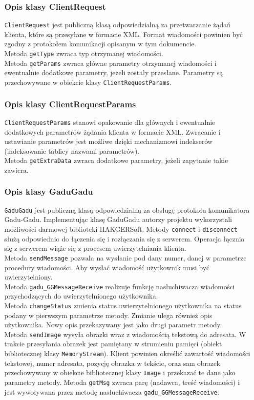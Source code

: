 \documentclass[a4paper,12pt]{article}
\begin{document}
\subsubsection[Opis klasy ClientRequest]{Opis klasy ClientRequest}
\texttt{ClientRequest} jest publiczną klasą odpowiedzialną za przetwarzanie żądań klienta, które są przesyłane w formacie XML.
Format wiadomości powinien być zgodny z protokołem komunikacji opisanym w tym dokumencie.\\
Metoda \texttt{getType} zwraca typ otrzymanej wiadomości.\\
Metoda \texttt{getParams} zwraca główne parametry otrzymanej wiadomości i ewentualnie dodatkowe parametry, jeżeli zostały przesłane. Parametry są przechowywane w obiekcie klasy \texttt{ClientRequestParams}.

\subsubsection[Opis klasy ClientRequestParams]{Opis klasy ClientRequestParams}
\texttt{ClientRequestParams} stanowi opakowanie dla głównych i ewentualnie dodatkowych parametrów żądania klienta w formacie XML. Zwracanie i ustawianie parametrów jest możliwe dzięki mechanizmowi indekserów (indeksowanie tablicy nazwami parametrów).\\
Metoda \texttt{getExtraData} zwraca dodatkowe parametry, jeżeli zapytanie takie zawiera.

\subsubsection[Opis klasy GaduGadu]{Opis klasy GaduGadu}
\texttt{GaduGadu} jest publiczną klasą odpowiedzialną za obsługę protokołu komunikatora Gadu-Gadu.
Implementując klasę GaduGadu autorzy projektu wykorzystali możliwości darmowej biblioteki HAKGERSoft.
Metody \texttt{connect} i \texttt{disconnect} służą odpowiednio do łączenia się i rozłączania się z serwerem.
Operacja łącznia się z serwerem wiąże się z procesem uwierzytelniania klienta.\\
Metoda \texttt{sendMessage} pozwala na wysłanie pod dany numer, danej w parametrze procedury wiadomości.
Aby wysłać wiadomość użytkownik musi być uwierzytelniony.\\
Metoda \texttt{gadu\_GGMessageReceive} realizuje funkcję nasłuchiwacza wiadomości przychodzących do uwierzytelnionego użytkownika.\\
Metoda \texttt{changeStatus} zmienia status uwierzytelnionego użytkownika na status podany w pierwszym parametrze metody. Zmianie ulega również opis użytkownika. Nowy opis przekazywany jest jako drugi parametr metody.\\
Metoda \texttt{sendImage} wysyła obrazki wraz z wiadomością tekstową do adresata. W trakcie przesyłania obrazek jest pamiętany w strumieniu pamięci (obiekt bibliotecznej klasy \texttt{MemoryStream}). Klient powinien określić zawartość wiadomości tekstowej, numer adresata, pozycję obrazka w tekście, oraz sam obrazek przechowywany w obiekcie bibliotecznej klasy \texttt{Image} i przekazać te dane jako parametry metody.
Metoda \texttt{getMsg} zwraca parę (nadawca, treść wiadomości) i jest wywoływana przez metodę nasłuchiwacza \texttt{gadu\_GGMessageReceive}.
\end{document}
